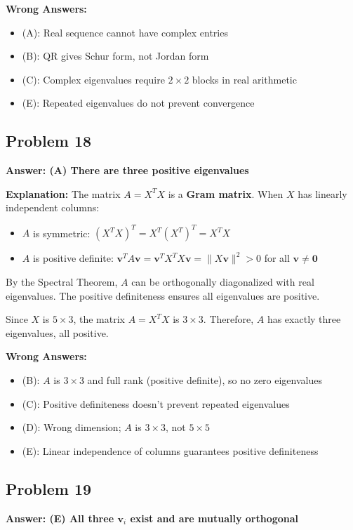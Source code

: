 \documentclass[12pt]{amsart}
\newcommand{\correct}[1]{{\color{correctgreen}\textbf{#1}}}
\begin{document}
\textbf{Wrong Answers:}
\begin{itemize}
\item (A): Real sequence cannot have complex entries
\item (B): QR gives Schur form, not Jordan form
\item (C): Complex eigenvalues require $2 \times 2$ blocks in real arithmetic
\item (E): Repeated eigenvalues do not prevent convergence
\end{itemize}

\subsection*{Problem 18}
\correct{Answer: (A) There are three positive eigenvalues}

\textbf{Explanation:} The matrix $A = X^TX$ is a \textbf{Gram matrix}. When $X$ has linearly independent columns:
\begin{itemize}
\item $A$ is symmetric: $(X^TX)^T = X^T(X^T)^T = X^TX$
\item $A$ is positive definite: $\mathbf{v}^T A \mathbf{v} = \mathbf{v}^T X^T X \mathbf{v} = \|X\mathbf{v}\|^2 > 0$ for all $\mathbf{v} \neq \mathbf{0}$
\end{itemize}

By the Spectral Theorem, $A$ can be orthogonally diagonalized with real eigenvalues. The positive definiteness ensures all eigenvalues are positive.

Since $X$ is $5 \times 3$, the matrix $A = X^TX$ is $3 \times 3$. Therefore, $A$ has exactly three eigenvalues, all positive.

\textbf{Wrong Answers:}
\begin{itemize}
\item (B): $A$ is $3 \times 3$ and full rank (positive definite), so no zero eigenvalues
\item (C): Positive definiteness doesn't prevent repeated eigenvalues
\item (D): Wrong dimension; $A$ is $3 \times 3$, not $5 \times 5$
\item (E): Linear independence of columns guarantees positive definiteness
\end{itemize}

\subsection*{Problem 19}
\correct{Answer: (E) All three $\mathbf{v}_i$ exist and are mutually orthogonal}
\end{document}
